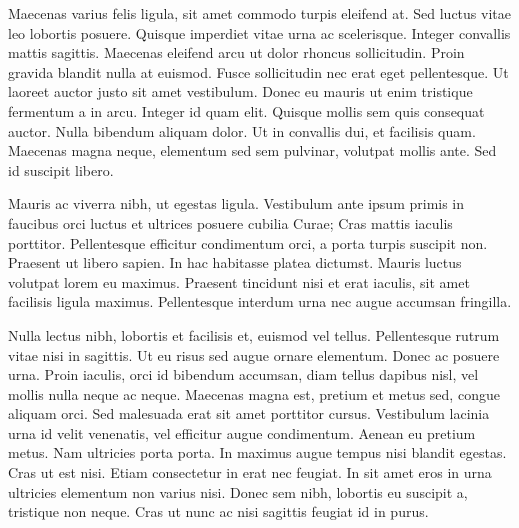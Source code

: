 Maecenas varius felis ligula, sit amet commodo turpis eleifend at. Sed luctus
vitae leo lobortis posuere. Quisque imperdiet vitae urna ac scelerisque. Integer
convallis mattis sagittis. Maecenas eleifend arcu ut dolor rhoncus
sollicitudin. Proin gravida blandit nulla at euismod. Fusce sollicitudin nec
erat eget pellentesque. Ut laoreet auctor justo sit amet vestibulum. Donec eu
mauris ut enim tristique fermentum a in arcu. Integer id quam elit. Quisque
mollis sem quis consequat auctor. Nulla bibendum aliquam dolor. Ut in convallis
dui, et facilisis quam. Maecenas magna neque, elementum sed sem pulvinar,
volutpat mollis ante. Sed id suscipit libero.

Mauris ac viverra nibh, ut egestas ligula. Vestibulum ante ipsum primis in
faucibus orci luctus et ultrices posuere cubilia Curae; Cras mattis iaculis
porttitor. Pellentesque efficitur condimentum orci, a porta turpis suscipit
non. Praesent ut libero sapien. In hac habitasse platea dictumst. Mauris luctus
volutpat lorem eu maximus. Praesent tincidunt nisi et erat iaculis, sit amet
facilisis ligula maximus. Pellentesque interdum urna nec augue accumsan
fringilla.

Nulla lectus nibh, lobortis et facilisis et, euismod vel tellus. Pellentesque
rutrum vitae nisi in sagittis. Ut eu risus sed augue ornare elementum. Donec ac
posuere urna. Proin iaculis, orci id bibendum accumsan, diam tellus dapibus
nisl, vel mollis nulla neque ac neque. Maecenas magna est, pretium et metus sed,
congue aliquam orci. Sed malesuada erat sit amet porttitor cursus. Vestibulum
lacinia urna id velit venenatis, vel efficitur augue condimentum. Aenean eu
pretium metus. Nam ultricies porta porta. In maximus augue tempus nisi blandit
egestas. Cras ut est nisi. Etiam consectetur in erat nec feugiat. In sit amet
eros in urna ultricies elementum non varius nisi. Donec sem nibh, lobortis eu
suscipit a, tristique non neque. Cras ut nunc ac nisi sagittis feugiat id in
purus.
